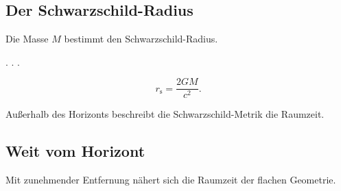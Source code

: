 \subsection{Der Schwarzschild-Radius}

Die Masse $M$ bestimmt den Schwarzschild-Radius.

. . .

\[
r_\mathrm{s} = \frac{2GM}{c^2}.
\]


Außerhalb des Horizonts beschreibt die Schwarzschild-Metrik die Raumzeit.

\subsection{Weit vom Horizont}

Mit zunehmender Entfernung nähert sich die Raumzeit der flachen Geometrie.
